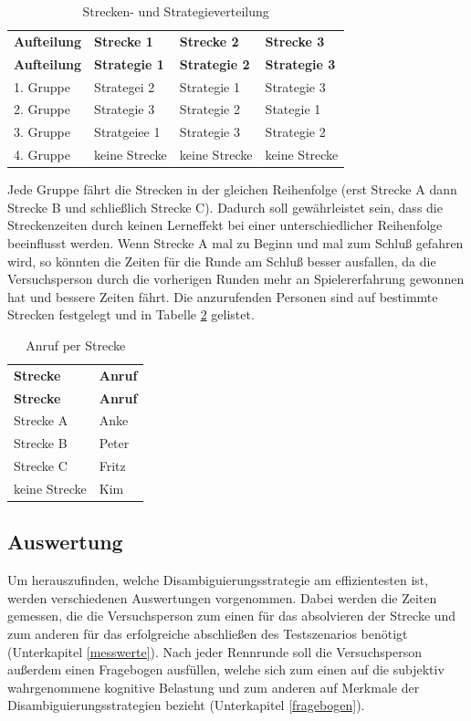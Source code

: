 \documentclass[12pt,a4paper]{scrartcl}
\begin{document}
\begin{longtable}{p{3cm}p{3cm}p{3cm}p{3cm} }
	\label{ablauf}\\
	\caption[Strecken- und Strategieverteilung]{Strecken- und Strategieverteilung}\\
	\hline
	\textbf{Aufteilung}&\textbf{Strecke 1}&\textbf{Strecke 2} &\textbf{Strecke 3}\\
	\hline
	\endfirsthead
	\hline
	\textbf{Aufteilung}&\textbf{Strategie 1}&\textbf{Strategie 2} &\textbf{Strategie 3}\\
	\hline
	\endhead
1. Gruppe & Strategei 2 & Strategie 1 & Strategie 3 \\
2. Gruppe & Strategie 3 & Strategie 2 & Stategie 1\\
3. Gruppe  & Stratgeiee 1 & Strategie 3 & Strategie 2\\
4. Gruppe   & keine Strecke & keine Strecke & keine Strecke\\ 
\hline
\end{longtable}

Jede Gruppe fährt die Strecken in der gleichen Reihenfolge (erst Strecke A dann Strecke B und schließlich Strecke C). Dadurch soll gewährleistet sein, dass die Streckenzeiten durch keinen Lerneffekt bei einer unterschiedlicher Reihenfolge beeinflusst werden. Wenn Strecke A mal zu Beginn und mal zum Schluß gefahren wird, so könnten die Zeiten für die Runde am Schluß besser ausfallen, da die Versuchsperson durch die vorherigen Runden mehr an Spielererfahrung gewonnen hat und bessere Zeiten fährt. Die anzurufenden Personen sind auf bestimmte Strecken festgelegt und in Tabelle \ref{anrufstrecke} gelistet. 

\begin{longtable}{p{6cm}p{6cm}}
	\label{anrufstrecke}\\
	\caption[Anruf per Strecke]{Anruf per Strecke}\\
	\hline
	\textbf{Strecke} &	\textbf{Anruf}\\
	\hline
	\endfirsthead
	\hline
	\textbf{Strecke} &	\textbf{Anruf}\\
	\hline
	\endhead
Strecke A & Anke\\
Strecke B & Peter\\
Strecke C & Fritz\\
keine Strecke & Kim\\


\hline
\end{longtable}

\subsection{Auswertung}
Um herauszufinden, welche Disambiguierungsstrategie am effizientesten ist, werden verschiedenen Auswertungen vorgenommen. 
Dabei werden die Zeiten gemessen, die die Versuchsperson zum einen für das absolvieren der Strecke und zum anderen für das erfolgreiche abschließen des Testszenarios benötigt (Unterkapitel \ref{messwerte}).
Nach jeder Rennrunde soll die Versuchsperson außerdem einen Fragebogen ausfüllen, welche sich zum einen auf die subjektiv wahrgenommene kognitive Belastung und zum anderen auf Merkmale der Disambiguierungsstrategien bezieht (Unterkapitel \ref{fragebogen}). 
\end{document}
